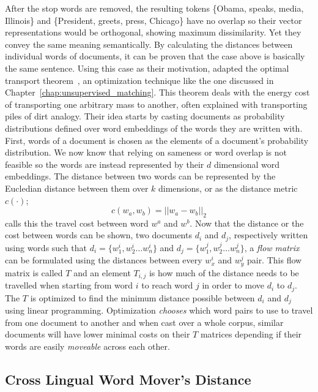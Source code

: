 After the stop words are removed, the resulting tokens \{Obama, speaks, media, Illinois\} and \{President, greets, press, Chicago\} have no overlap so their vector representations would be orthogonal, showing maximum dissimilarity.
Yet they convey the same meaning semantically.
By calculating the distances between individual words of documents, it can be proven that the case above is basically the same sentence.
Using this case as their motivation, \citeauthor{kusner_word_2015} adapted the optimal transport theorem~\cite{kantorovitch_translocation_1958}, an optimization technique like the one discussed in Chapter~\ref{chap:unsupervised_matching}.
This theorem deals with the energy cost of transporting one arbitrary mass to another, often explained with transporting piles of dirt analogy.
Their idea starts by casting documents as probability distributions defined over word embeddings of the words they are written with.
First, words of a document is chosen as the elements of a document's probability distribution.
We now know that relying on sameness or word overlap is not feasible so the words are instead represented by their $d$ dimensional word embeddings.
The distance between two words can be represented by the Eucledian distance between them over $k$ dimensions, or as the distance metric $c(\cdot)$;
\begin{displaymath}
    c(w_a, w_b) = || w_a - w_b ||_2
\end{displaymath}
\textcite{kusner_word_2015} calls this the travel cost between word $w^a$ and $w^b$.
Now that the distance or the cost between words can be shown, two documents $d_i$ and $d_j$, respectively written using words such that $d_i = \{w^{i}_1, w^{i}_2 \dots w^{i}_n\}$ and $d_j = \{w^{j}_1, w^{j}_2 \dots w^{j}_n\}$, a \emph{flow matrix} can be formulated using the distances between every $w^{i}_x$ and $w^{j}_y$ pair.
This flow matrix is called $T$ and an element $T_{i,j}$ is how much of the distance needs to be travelled when starting from word $i$ to reach word $j$ in order to move $d_i$ to $d_j$.
The $T$ is optimized to find the minimum distance possible between $d_i$ and $d_j$ using linear programming.
Optimization \emph{chooses} which word pairs to use to travel from one document to another and when cast over a whole corpus, similar documents will have lower minimal costs on their $T$ matrices depending if their words are easily \emph{moveable} across each other.

\subsection{Cross Lingual Word Mover's Distance}%
\label{sub:clemd}

